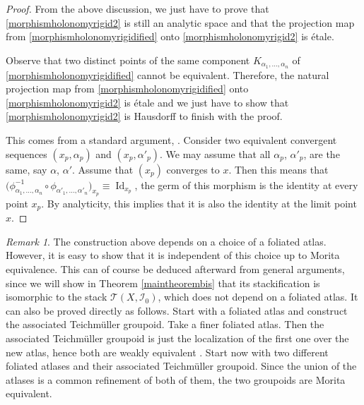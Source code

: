 \documentclass[JEP,XML,SOM,Unicode]{cedram}
\let\mathcal\mathscr
\DeclareMathOperator{\Id}{Id}
\theoremstyle{plain}
\theoremstyle{definition}
\theoremstyle{remark}
\newtheorem{remark}[theorem]{Remark}
\numberwithin{equation}{section}
\newcommand{\cI}{\mathcal{I}}
\begin{document}
\begin{proof}
From the above discussion, we just have to prove that \eqref{morphismholonomyrigid2} is still an analytic space and that the projection map from \eqref{morphismholonomyrigidified} onto \eqref{morphismholonomyrigid2} is étale.

Observe that two distinct points of the same component $K_{\alpha_1,\hdots,\alpha_n}$ of \eqref{morphismholonomyrigidified} cannot be equivalent. Therefore, the natural projection
map from \eqref{morphismholonomyrigidified} onto \eqref{morphismholonomyrigid2} is étale and we just have to show that \eqref{morphismholonomyrigid2} is Hausdorff to finish with the proof.

This comes from a standard argument, \cf \cite[Prop.\,3.2]{Brunella}. Consider two equivalent convergent sequences $(x_p,\alpha_p)$ and $(x_p, \alpha'_p)$. We may assume that all $\alpha_p$, \resp $\alpha'_p$, are the same, say $\alpha$, \resp $\alpha'$. Assume that $(x_p)$ converges to $x$. Then this means that $\big (\phi^{-1}_{\alpha_1,\hdots,\alpha_n}\circ \phi_{\alpha'_1,\hdots,\alpha'_n}\big )_{x_p}\equiv \Id_{x_p}$, \ie the germ of this morphism is the identity at every point $x_p$. By analyticity, this implies that it is also the identity at the limit point $x$.
\end{proof}

\begin{remark}
\label{moritaequivrigid}
The construction above depends on a choice of a foliated atlas. However, it is easy to show that it is independent of this choice up to Morita equivalence. This can of course be deduced afterward from general arguments, since we will show in Theorem \ref{maintheorembis} that its stackification is isomorphic to the stack $\mathcal T(X,\cI_0)$, which does not depend on a foliated atlas. It can also be proved directly as follows. Start with a foliated atlas and construct the associated Teichmüller groupoid. Take a finer foliated atlas. Then the associated Teichmüller groupoid is just the localization of the first one over the new atlas, hence both are weakly equivalent \cite{Ha}. Start now with two different foliated atlases and their associated Teichmüller groupoid. Since the union of the atlases is a common refinement of both of them, the two groupoids are Morita equivalent.
\end{remark}
\end{document}
